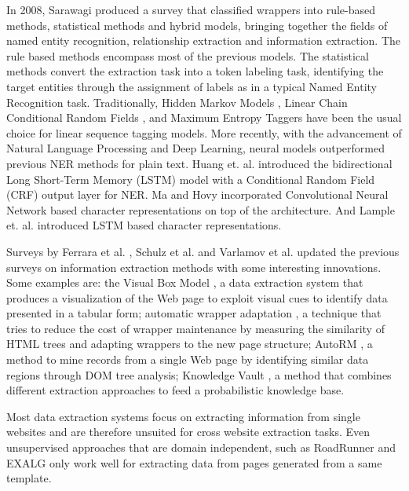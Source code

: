 \documentclass{nle}
\begin{document}
In 2008, Sarawagi  produced a survey that classified wrappers into
rule-based methods, statistical methods and hybrid models, bringing together 
the fields of named entity recognition, relationship extraction and information extraction. 
The rule based methods encompass most of the 
previous models. The statistical methods convert the extraction task into a token labeling 
task, identifying the target entities through the assignment of labels as in a typical 
Named Entity Recognition task. Traditionally, Hidden Markov Models \cite{Leek1997,Freitag1999}, 
Linear Chain Conditional Random Fields \cite{Lafferty2001}, and Maximum Entropy Taggers 
\cite{McCallum2000} have been the usual choice for linear sequence tagging models.
More recently, with the advancement of Natural Language Processing and Deep Learning, 
neural models outperformed previous NER methods for plain text. Huang et. al.  introduced the 
bidirectional Long Short-Term Memory (LSTM) model with a Conditional Random Field (CRF) output layer
for NER. Ma and Hovy  incorporated Convolutional Neural Network based character representations 
on top of the architecture. And Lample et. al.  introduced
LSTM based character representations. 

Surveys by Ferrara et al. , Schulz et al.  and 
Varlamov et al.  updated the previous surveys on information 
extraction methods with some interesting innovations. 
Some examples are: the Visual Box Model \cite{Krupl2005}, a data extraction system that produces 
a visualization of the Web page to exploit visual cues to identify data presented in a tabular form;
automatic wrapper adaptation \cite{Ferrara2011}, a technique that tries to reduce the cost of 
wrapper maintenance by measuring the similarity of HTML trees and adapting
wrappers to the new page structure; AutoRM \cite{Shi2015}, a method to mine
records from a single Web page by identifying similar data regions through DOM
tree analysis; Knowledge Vault \cite{Dong2014}, a method that combines different 
extraction approaches to feed a probabilistic knowledge base.

Most data extraction systems focus on extracting information from single websites
and are therefore unsuited for cross website extraction tasks. Even unsupervised
approaches that are domain independent, such as RoadRunner \cite{Crescenzi2001} 
and EXALG \cite{Arasu2003} only work well for extracting data from pages generated 
from a same template. 
\end{document}
